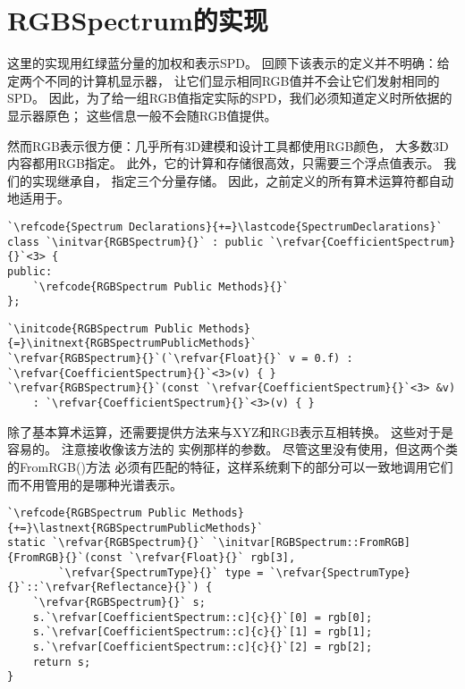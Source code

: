 \section{RGBSpectrum的实现}\label{sec:RGBSpectrum的实现}

这里的实现用红绿蓝分量的加权和表示SPD。
回顾下该表示的定义并不明确：给定两个不同的计算机显示器，
让它们显示相同RGB值并不会让它们发射相同的SPD。
因此，为了给一组RGB值指定实际的SPD，我们必须知道定义时所依据的显示器原色；
这些信息一般不会随RGB值提供。

然而RGB表示很方便：几乎所有3D建模和设计工具都使用RGB颜色，
大多数3D内容都用RGB指定。
此外，它的计算和存储很高效，只需要三个浮点值表示。
我们的实现继承自，
指定三个分量存储。
因此，之前定义的所有算术运算符都自动地适用于。
\begin{lstlisting}
`\refcode{Spectrum Declarations}{+=}\lastcode{SpectrumDeclarations}`
class `\initvar{RGBSpectrum}{}` : public `\refvar{CoefficientSpectrum}{}`<3> {
public:
    `\refcode{RGBSpectrum Public Methods}{}`
};
\end{lstlisting}
\begin{lstlisting}
`\initcode{RGBSpectrum Public Methods}{=}\initnext{RGBSpectrumPublicMethods}`
`\refvar{RGBSpectrum}{}`(`\refvar{Float}{}` v = 0.f) : `\refvar{CoefficientSpectrum}{}`<3>(v) { }
`\refvar{RGBSpectrum}{}`(const `\refvar{CoefficientSpectrum}{}`<3> &v)
    : `\refvar{CoefficientSpectrum}{}`<3>(v) { }
\end{lstlisting}

除了基本算术运算，还需要提供方法来与XYZ和RGB表示互相转换。
这些对于是容易的。
注意接收像该方法的
实例那样的参数。
尽管这里没有使用，但这两个类的{\ttfamily FromRGB()}方法
必须有匹配的特征，这样系统剩下的部分可以一致地调用它们而不用管用的是哪种光谱表示。
\begin{lstlisting}
`\refcode{RGBSpectrum Public Methods}{+=}\lastnext{RGBSpectrumPublicMethods}`
static `\refvar{RGBSpectrum}{}` `\initvar[RGBSpectrum::FromRGB]{FromRGB}{}`(const `\refvar{Float}{}` rgb[3],
        `\refvar{SpectrumType}{}` type = `\refvar{SpectrumType}{}`::`\refvar{Reflectance}{}`) {
    `\refvar{RGBSpectrum}{}` s;
    s.`\refvar[CoefficientSpectrum::c]{c}{}`[0] = rgb[0];
    s.`\refvar[CoefficientSpectrum::c]{c}{}`[1] = rgb[1];
    s.`\refvar[CoefficientSpectrum::c]{c}{}`[2] = rgb[2];
    return s;
}
\end{lstlisting}

